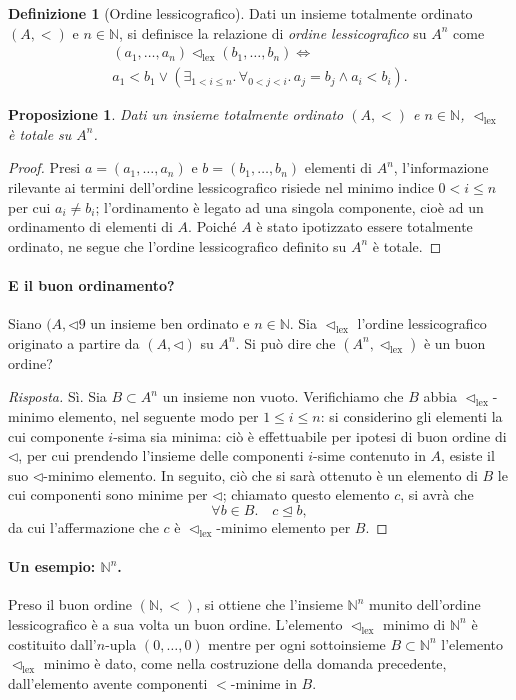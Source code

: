 \documentclass[fontsize = 11 pt, paper=A4, oneside, index=totoc, hyperref]{article}
\theoremstyle{definition}
\newtheorem{dfn}{Definizione}[section]
\theoremstyle{plain}
\newtheorem{prp}{Proposizione}[section]
\newcommand{\N}{\mathbb{N}}
\newcommand{\ordine}[1]{\vartriangleleft_{\mathrm{#1}}}
\begin{document}
\begin{dfn}[Ordine lessicografico]
  Dati un insieme totalmente ordinato \((A,<)\) e \(n \in \N\), si definisce la relazione di \emph{ordine lessicografico} su \(A^n\) come
  \begin{multline}
    (a_1,\dots,a_n) \ordine{lex} (b_1,\dots,b_n) \iff \\ a_1 < b_1 \lor \left( \exists_{1 < i \le n}.\, \forall_{0 < j < i}.\, a_j = b_j \land a_i < b_i\right).
  \end{multline}
\end{dfn}
\begin{prp}
  Dati un insieme totalmente ordinato \((A, <)\) e \(n \in \N\), \(\ordine{lex}\) è totale su \(A^n\).
\end{prp}
\begin{proof}
  Presi \(a = (a_1,\dots,a_n)\) e \(b = (b_1,\dots,b_n)\) elementi di \(A^n\), l'informazione rilevante ai termini dell'ordine lessicografico risiede nel minimo indice \(0 < i \le n\) per cui \(a_i \neq b_i\); l'ordinamento è legato ad una singola componente, cioè ad un ordinamento di elementi di \(A\). Poiché \(A\) è stato ipotizzato essere totalmente ordinato, ne segue che l'ordine lessicografico definito su \(A^n\) è totale.
\end{proof}

\paragraph{E il buon ordinamento?} Siano \((A,\lhd9\) un insieme ben ordinato e \(n \in \N\). Sia \(\ordine{lex}\) l'ordine lessicografico originato a partire da \((A,\lhd)\) su \(A^n\). Si può dire che \((A^n,\ordine{lex})\) è un buon ordine?
\begin{proof}[Risposta]
  Sì. Sia \(B \subset A^n\) un insieme non vuoto. Verifichiamo che \(B\) abbia \(\ordine{lex}\)-minimo elemento, nel seguente modo per \(1 \le i \le n\): si considerino gli elementi la cui componente \(i\)-sima sia minima: ciò è effettuabile per ipotesi di buon ordine di \(\lhd\), per cui prendendo l'insieme delle componenti \(i\)-sime contenuto in \(A\), esiste il suo \(\lhd\)-minimo elemento. In seguito, ciò che si sarà ottenuto è un elemento di \(B\) le cui componenti sono minime per \(\lhd\); chiamato questo elemento \(c\), si avrà che
  \[
  \forall b \in B.\quad c \unlhd b,
  \]
  da cui l'affermazione che \(c\) è \(\ordine{lex}\)-minimo elemento per \(B\).
\end{proof}
\paragraph{Un esempio: \(\N^n\).} Preso il buon ordine \((\N, <)\), si ottiene che l'insieme \(\N^n\) munito dell'ordine lessicografico è a sua volta un buon ordine. L'elemento \(\ordine{lex}\) minimo di \(\N^n\) è costituito dall'\(n\)-upla \((0,\dots,0)\) mentre per ogni sottoinsieme \(B \subset \N^n\) l'elemento \(\ordine{lex}\) minimo è dato, come nella costruzione della domanda precedente, dall'elemento avente componenti \(<\)-minime in \(B\).
\end{document}
